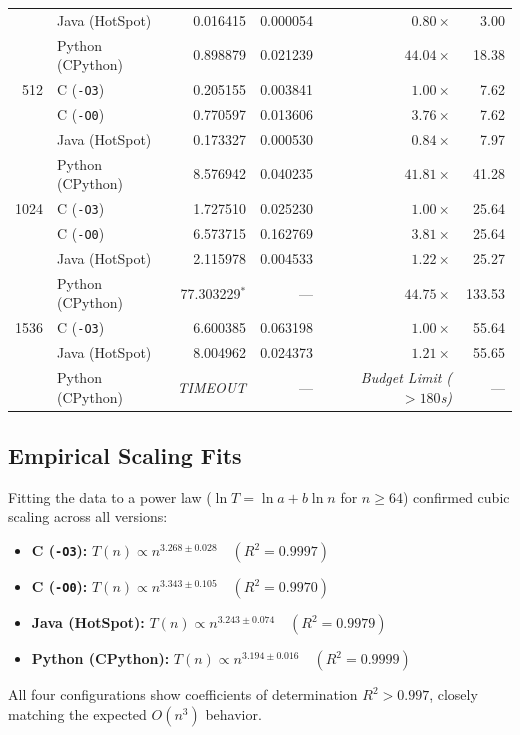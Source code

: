 \documentclass[10pt,conference,a4paper]{IEEEtran}
\begin{document}
\begin{table}[t]
\begin{tabular}{r l r r r r}
    & Java (HotSpot)   & 0.016415 & 0.000054 & $0.80\times$ & 3.00 \\
    & Python (CPython) & 0.898879 & 0.021239 & $44.04\times$ & 18.38 \\
\midrule
512 & C (\texttt{-O3}) & 0.205155 & 0.003841 & $1.00\times$ & 7.62 \\
    & C (\texttt{-O0}) & 0.770597 & 0.013606 & $3.76\times$ & 7.62 \\
    & Java (HotSpot)   & 0.173327 & 0.000530 & $0.84\times$ & 7.97 \\
    & Python (CPython) & 8.576942 & 0.040235 & $41.81\times$ & 41.28 \\
\midrule
1024 & C (\texttt{-O3}) & 1.727510 & 0.025230 & $1.00\times$ & 25.64 \\
     & C (\texttt{-O0}) & 6.573715 & 0.162769 & $3.81\times$ & 25.64 \\
     & Java (HotSpot)   & 2.115978 & 0.004533 & $1.22\times$ & 25.27 \\
     & Python (CPython) & 77.303229$^*$ & --- & $44.75\times$ & 133.53 \\
\midrule
1536 & C (\texttt{-O3}) & 6.600385 & 0.063198 & $1.00\times$ & 55.64 \\
     & Java (HotSpot)   & 8.004962 & 0.024373 & $1.21\times$ & 55.65 \\
     & Python (CPython) & \textit{TIMEOUT} & --- & \textit{Budget Limit ($>180$s)} & --- \\
\bottomrule
\end{tabular}
\end{table}

\subsection{Empirical Scaling Fits}
Fitting the data to a power law ($\ln T = \ln a + b \ln n$ for $n \ge 64$) confirmed cubic scaling across all versions:
\begin{itemize}
    \item \textbf{C (\texttt{-O3}):} $T(n) \propto n^{3.268 \pm 0.028} \quad (R^2 = 0.9997)$
    \item \textbf{C (\texttt{-O0}):} $T(n) \propto n^{3.343 \pm 0.105} \quad (R^2 = 0.9970)$
    \item \textbf{Java (HotSpot):} $T(n) \propto n^{3.243 \pm 0.074} \quad (R^2 = 0.9979)$
    \item \textbf{Python (CPython):} $T(n) \propto n^{3.194 \pm 0.016} \quad (R^2 = 0.9999)$
\end{itemize}
All four configurations show coefficients of determination $R^2 > 0.997$, closely matching the expected $O(n^3)$ behavior.
\end{document}
